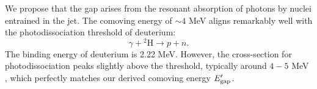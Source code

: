 \documentclass[linenumbers,twocolumn]{aastex631}
\begin{document}




We propose that the gap arises from the resonant absorption of photons by nuclei entrained in the jet. The comoving energy of $\sim 4$ MeV aligns remarkably well with the photodissociation threshold of deuterium:
\begin{equation}
\gamma + {^2\text{H}} \rightarrow p + n.
\end{equation}
The binding energy of deuterium is 2.22 MeV. However, the cross-section for photodissociation peaks slightly above the threshold, typically around $4-5$ MeV \citep{IAEA2000}, which perfectly matches our derived comoving energy $E_{\rm gap}^{\prime}$.
\end{document}

